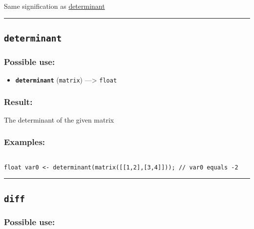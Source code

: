 \documentclass[]{book}
\providecommand{\tightlist}{%
  \setlength{\itemsep}{0pt}\setlength{\parskip}{0pt}}
\theoremstyle{definition}
\theoremstyle{definition}
\theoremstyle{definition}
\theoremstyle{remark}
\begin{document}
Same signification as \href{OperatorsDH\#determinant}{determinant}

\begin{center}\rule{0.5\linewidth}{\linethickness}\end{center}

\subsection{\texorpdfstring{\texttt{determinant}}{determinant}}\label{determinant}

\subsubsection{Possible use:}\label{possible-use-129}

\begin{itemize}
\tightlist
\item
  \textbf{\texttt{determinant}} (\texttt{matrix}) ---\textgreater{}
  \texttt{float}
\end{itemize}

\subsubsection{Result:}\label{result-125}

The determinant of the given matrix

\subsubsection{Examples:}\label{examples-99}

\begin{verbatim}
 
float var0 <- determinant(matrix([[1,2],[3,4]])); // var0 equals -2
\end{verbatim}

\begin{center}\rule{0.5\linewidth}{\linethickness}\end{center}

\subsection{\texorpdfstring{\texttt{diff}}{diff}}\label{diff}

\subsubsection{Possible use:}\label{possible-use-130}
\end{document}
